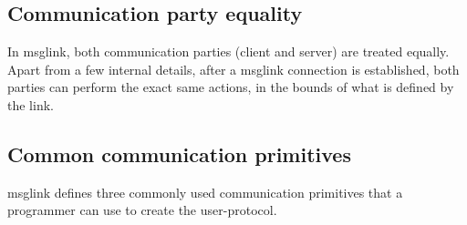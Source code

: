 \documentclass[conference]{IEEEtran}
\begin{document}
\subsection{Communication party equality}

In msglink, both communication parties (client and server) are treated equally. Apart from a few internal details, after a msglink connection is established, both parties can perform the exact same actions, in the bounds of what is defined by the link.


\subsection{Common communication primitives}

msglink defines three commonly used communication primitives that a programmer can use to create the user-protocol.
\end{document}
